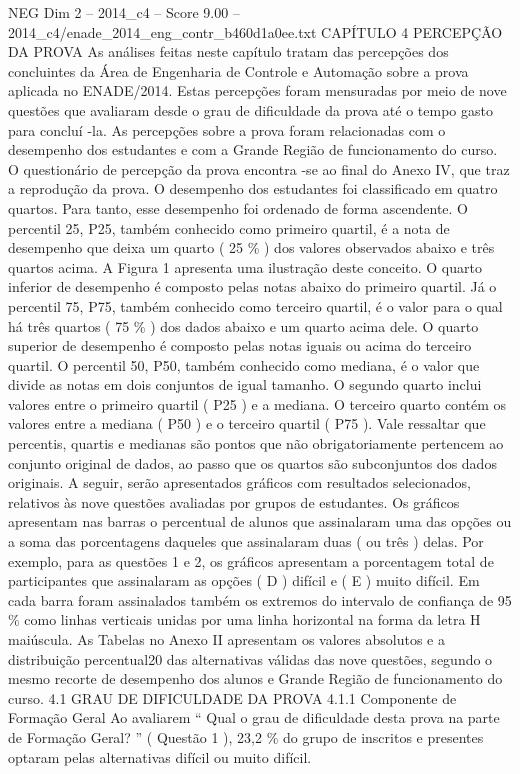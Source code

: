 \begin{textsample}{NEG Dim 2 – 2014\_c4 – Score 9.00 – 2014\_c4/enade\_2014\_eng\_contr\_b460d1a0ee.txt}  \label{ex:f2_neg_316}
CAPÍTULO 4 PERCEPÇÃO DA PROVA As análises feitas neste capítulo tratam das percepções dos concluintes da Área de Engenharia de Controle e Automação sobre a prova aplicada no ENADE/2014.
Estas percepções foram mensuradas por meio de nove questões que avaliaram desde o grau de dificuldade da prova até o tempo gasto para concluí -la.
As percepções sobre a prova foram relacionadas com o desempenho dos estudantes e com a Grande Região de funcionamento do curso.
O questionário de percepção da prova encontra -se ao final do Anexo IV, que traz a reprodução da prova.
O desempenho dos estudantes foi classificado em quatro quartos.
Para tanto, esse desempenho foi ordenado de forma ascendente.
O percentil 25, P25, também conhecido como primeiro quartil, é a nota de desempenho que deixa um quarto ( 25 \% ) dos valores observados abaixo e três quartos acima.
A Figura 1 apresenta uma ilustração deste conceito.
O quarto inferior de desempenho é composto pelas notas abaixo do primeiro quartil.
Já o percentil 75, P75, também conhecido como terceiro quartil, é o valor para o qual há três quartos ( 75 \% ) dos dados abaixo e um quarto acima dele.
O quarto superior de desempenho é composto pelas notas iguais ou acima do terceiro quartil.
O percentil 50, P50, também conhecido como mediana, é o valor que divide as notas em dois conjuntos de igual tamanho.
O segundo quarto inclui valores entre o primeiro quartil ( P25 ) e a mediana.
O terceiro quarto contém os valores entre a mediana ( P50 ) e o terceiro quartil ( P75 ).
Vale ressaltar que percentis, quartis e medianas são pontos que não obrigatoriamente pertencem ao conjunto original de dados, ao passo que os quartos são subconjuntos dos dados originais.
A seguir, serão apresentados gráficos com resultados selecionados, relativos às nove questões avaliadas por grupos de estudantes.
Os gráficos apresentam nas barras o percentual de alunos que assinalaram uma das opções ou a soma das porcentagens daqueles que assinalaram duas ( ou três ) delas.
Por exemplo, para as questões 1 e 2, os gráficos apresentam a porcentagem total de participantes que assinalaram as opções ( D ) difícil e ( E ) muito difícil.
Em cada barra foram assinalados também os extremos do intervalo de confiança de 95 \% como linhas verticais unidas por uma linha horizontal na forma da letra H maiúscula.
As Tabelas no Anexo II apresentam os valores absolutos e a distribuição percentual20 das alternativas válidas das nove questões, segundo o mesmo recorte de desempenho dos alunos e Grande Região de funcionamento do curso. 4.1 GRAU DE DIFICULDADE DA PROVA 4.1.1 Componente de Formação Geral Ao avaliarem “ Qual o grau de dificuldade desta prova na parte de Formação Geral? ” ( Questão 1 ), 23,2 \% do grupo de inscritos e presentes optaram pelas alternativas difícil ou muito difícil.

\end{textsample}
